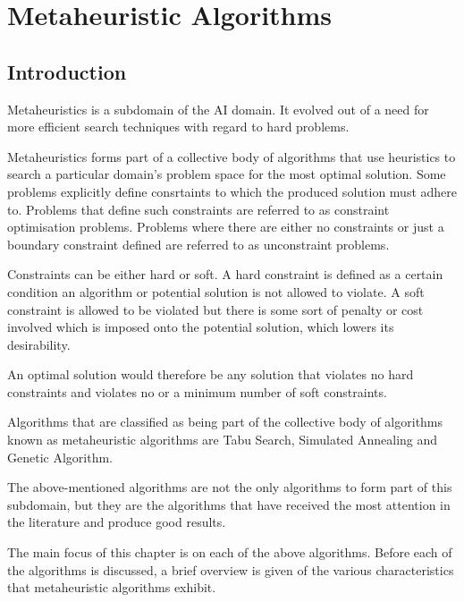 \chapter{Metaheuristic Algorithms}
\label{chpt:heuristic}
\section{Introduction}
Metaheuristics is a subdomain of the \gls{AI} domain\cite{AIModernApproach}. It evolved out of a need for more efficient search techniques with regard to hard problems. 

Metaheuristics forms part of a collective body of algorithms that use heuristics to search a particular domain's problem space for the most optimal solution\cite{AIModernApproach,NatureInspiredMetaHeuristic}. Some problems explicitly define consrtaints to which the produced solution must adhere to. Problems that define such constraints are referred to as constraint optimisation problems\cite{FundamentalSwarm}. Problems where there are either no constraints or just a boundary constraint  defined are referred to as unconstraint problems\cite{FundamentalSwarm}.

Constraints can be either hard or soft. A hard constraint is defined as a certain condition an algorithm or potential solution is not allowed to violate\cite{AIModernApproach,NatureInspiredMetaHeuristic,Karen2004,Eisenblatter}. A soft constraint is allowed to be violated but there is some sort of penalty or cost involved which is imposed onto the potential solution, which lowers its desirability\cite{AIModernApproach,NatureInspiredMetaHeuristic,Karen2004,Eisenblatter}. 

An optimal solution would therefore be any solution that violates no hard constraints and violates no or a minimum number of soft constraints\cite{AIModernApproach,NatureInspiredMetaHeuristic,Karen2004,Eisenblatter}.

Algorithms that are classified as being part of the collective body of algorithms known as metaheuristic algorithms are Tabu Search\cite{TabuVechicleRoutingWithTimeWindows,TabuCSP}, Simulated Annealing \cite{SASingleMultiObj,CurveFittingSA} and Genetic Algorithm\cite{GATSP, GeostatisticalGA}.

The above-mentioned algorithms are not the only algorithms to form part of this subdomain, but they are the algorithms that have received the most attention in the literature and produce good results\cite{SweepMeta}.

The main focus of this chapter is on each of the above algorithms. Before each of the algorithms is discussed, a brief overview is given of the various characteristics that metaheuristic algorithms exhibit. 

